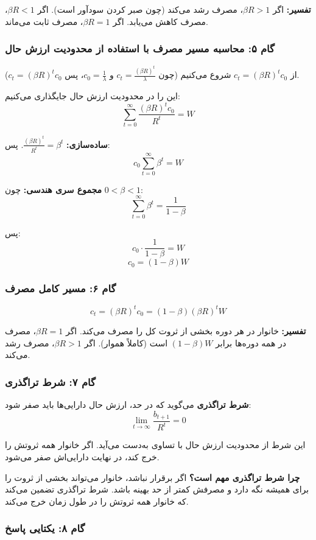 \documentclass[12pt,a4paper]{article}
\begin{document}
\textbf{تفسیر:} اگر $\beta R > 1$، مصرف رشد می‌کند (چون صبر کردن سودآور است). اگر $\beta R < 1$، مصرف کاهش می‌یابد. اگر $\beta R = 1$، مصرف ثابت می‌ماند.

\subsubsection{گام ۵: محاسبه مسیر مصرف با استفاده از محدودیت ارزش حال}

از $c_t = (\beta R)^t c_0$ شروع می‌کنیم (چون $c_t = \frac{(\beta R)^t}{\lambda}$ و $c_0 = \frac{1}{\lambda}$، پس $c_t = (\beta R)^t c_0$).

این را در محدودیت ارزش حال جایگذاری می‌کنیم:
\[
	\sum_{t=0}^{\infty} \frac{(\beta R)^t c_0}{R^t} = W
\]

\textbf{ساده‌سازی:} $\frac{(\beta R)^t}{R^t} = \beta^t$. پس:
\[
	c_0 \sum_{t=0}^{\infty} \beta^t = W
\]

\textbf{مجموع سری هندسی:} چون $0 < \beta < 1$:
\[
	\sum_{t=0}^{\infty} \beta^t = \frac{1}{1-\beta}
\]

پس:
\[
	c_0 \cdot \frac{1}{1-\beta} = W
\]
\[
	\boxed{c_0 = (1-\beta) W}
\]

\subsubsection{گام ۶: مسیر کامل مصرف}

\[
	\boxed{c_t = (\beta R)^t c_0 = (1-\beta)(\beta R)^t W}
\]

\textbf{تفسیر:} خانوار در هر دوره بخشی از ثروت کل را مصرف می‌کند. اگر $\beta R = 1$، مصرف در همه دوره‌ها برابر $(1-\beta)W$ است (کاملاً هموار). اگر $\beta R > 1$، مصرف رشد می‌کند.

\subsubsection{گام ۷: شرط تراگذری}

\textbf{شرط تراگذری} می‌گوید که در حد، ارزش حال دارایی‌ها باید صفر شود:
\[
	\lim_{t \to \infty} \frac{b_{t+1}}{R^t} = 0
\]

این شرط از محدودیت ارزش حال با تساوی به‌دست می‌آید. اگر خانوار همه ثروتش را خرج کند، در نهایت دارایی‌اش صفر می‌شود.

\textbf{چرا شرط تراگذری مهم است؟} اگر برقرار نباشد، خانوار می‌تواند بخشی از ثروت را برای همیشه نگه دارد و مصرفش کمتر از حد بهینه باشد. شرط تراگذری تضمین می‌کند که خانوار همه ثروتش را در طول زمان خرج می‌کند.

\subsubsection{گام ۸: یکتایی پاسخ}
\end{document}
